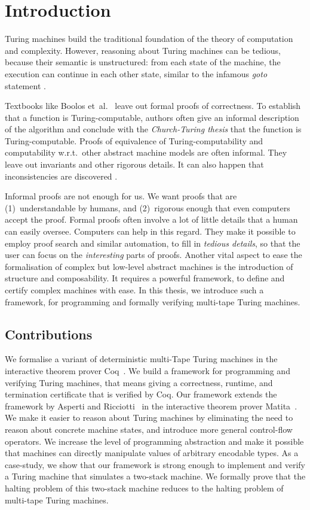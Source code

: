\chapter{Introduction}
\label{chap:intro}

Turing machines build the traditional foundation of the theory of computation and complexity.  However, reasoning about Turing machines can be
tedious, because their semantic is unstructured: from each state of the machine, the execution can continue in each other state, similar to the
infamous \textit{goto} statement \cite{dijkstra2002go}.

Textbooks like Boolos et~al.~\cite{boolos2007computability} leave out formal proofs of correctness.  To establish that a function is
Turing-computable, authors often give an informal description of the algorithm and conclude with the \textit{Church-Turing thesis} that the function
is Turing-computable.  Proofs of equivalence of Turing-computability and computability w.r.t.\ other abstract machine models are often informal.  They
leave out invariants and other rigorous details.  It can also happen that inconsistencies are discovered \cite{Xu:2013:MTM:2529315.2529331}.

Informal proofs are not enough for us.  We want proofs that are (1)~understandable by humans, and (2)~rigorous enough that even computers accept the
proof.  Formal proofs often involve a lot of little details that a human can easily oversee.  Computers can help in this regard.  They make it
possible to employ proof search and similar automation, to fill in \textit{tedious details}, so that the user can focus on the \textit{interesting}
parts of proofs.  Another vital aspect to ease the formalisation of complex but low-level abstract machines is the introduction of structure and
composability.  It requires a powerful framework, to define and certify complex machines with ease.  In this thesis, we introduce such a framework,
for programming and formally verifying multi-tape Turing machines.


\section{Contributions}
\label{sec:contributions}

We formalise a variant of deterministic multi-Tape Turing machines in the interactive theorem prover Coq~\cite{Coq}.  We build a framework for
programming and verifying Turing machines, that means giving a correctness, runtime, and termination certificate that is verified by Coq.  Our
framework extends the framework by Asperti and Ricciotti~\cite{asperti2015} in the interactive theorem prover Matita~\cite{asperti2011matita}.  We
make it easier to reason about Turing machines by eliminating the need to reason about concrete machine states, and introduce more general
control-flow operators.  We increase the level of programming abstraction and make it possible that machines can directly manipulate values of
arbitrary encodable types.  As a case-study, we show that our framework is strong enough to implement and verify a Turing machine that simulates a
two-stack machine.  We formally prove that the halting problem of this two-stack machine reduces to the halting problem of multi-tape Turing machines.

